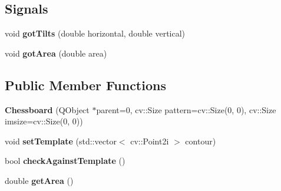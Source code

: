 \subsection*{Signals}
\begin{DoxyCompactItemize}
\item 
\hypertarget{class_chessboard_a9daceb67cea253e4178cf353f55a973b}{}void {\bfseries got\+Tilts} (double horizontal, double vertical)\label{class_chessboard_a9daceb67cea253e4178cf353f55a973b}

\item 
\hypertarget{class_chessboard_a98bac12fdee79933052af01a501a3735}{}void {\bfseries got\+Area} (double area)\label{class_chessboard_a98bac12fdee79933052af01a501a3735}

\end{DoxyCompactItemize}
\subsection*{Public Member Functions}
\begin{DoxyCompactItemize}
\item 
\hypertarget{class_chessboard_a422d312bd00059b1c3947276dbd8a765}{}{\bfseries Chessboard} (Q\+Object $\ast$parent=0, cv\+::\+Size pattern=cv\+::\+Size(0, 0), cv\+::\+Size imsize=cv\+::\+Size(0, 0))\label{class_chessboard_a422d312bd00059b1c3947276dbd8a765}

\item 
\hypertarget{class_chessboard_af0c13ce21b47526dad57770bfd3ea744}{}void {\bfseries set\+Template} (std\+::vector$<$ cv\+::\+Point2i $>$ contour)\label{class_chessboard_af0c13ce21b47526dad57770bfd3ea744}

\item 
\hypertarget{class_chessboard_aedcbee8b6cb47587b4b68051611400e9}{}bool {\bfseries check\+Against\+Template} ()\label{class_chessboard_aedcbee8b6cb47587b4b68051611400e9}

\item 
\hypertarget{class_chessboard_ac7c8d73a26dcab8af62bc484f46e2057}{}double {\bfseries get\+Area} ()\label{class_chessboard_ac7c8d73a26dcab8af62bc484f46e2057}

\end{DoxyCompactItemize}
